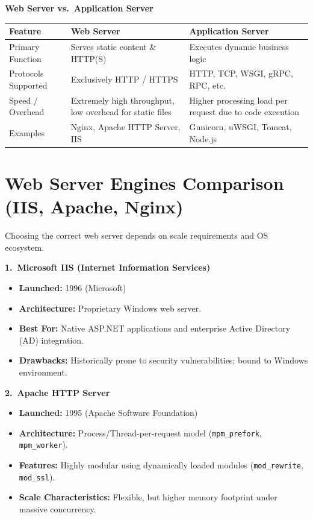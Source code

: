 ﻿\documentclass[8pt, a4paper]{article}
\begin{document}
\begin{conceptbox}
\textbf{Web Server vs.\ Application Server}

\smallskip
\begin{tabularx}{\linewidth}{l X X}
  \toprule
  \textbf{Feature} & \textbf{Web Server} & \textbf{Application Server} \\
  \midrule
  Primary Function    & Serves static content \& HTTP(S)                         & Executes dynamic business logic \\
  Protocols Supported & Exclusively HTTP / HTTPS                                 & HTTP, TCP, WSGI, gRPC, RPC, etc. \\
  Speed / Overhead    & Extremely high throughput, low overhead for static files & Higher processing load per request due to code execution \\
  Examples            & Nginx, Apache HTTP Server, IIS                           & Gunicorn, uWSGI, Tomcat, Node.js \\
  \bottomrule
\end{tabularx}
\end{conceptbox}

\section{Web Server Engines Comparison (IIS, Apache, Nginx)}

Choosing the correct web server depends on scale requirements and OS ecosystem.

\begin{conceptbox}
\textbf{1.\ Microsoft IIS (Internet Information Services)}
\begin{itemize}
  \item \textbf{Launched:} 1996 (Microsoft)
  \item \textbf{Architecture:} Proprietary Windows web server.
  \item \textbf{Best For:} Native ASP.NET applications and enterprise Active Directory (AD) integration.
  \item \textbf{Drawbacks:} Historically prone to security vulnerabilities; bound to Windows environment.
\end{itemize}
\end{conceptbox}

\begin{conceptbox}
\textbf{2.\ Apache HTTP Server}
\begin{itemize}
  \item \textbf{Launched:} 1995 (Apache Software Foundation)
  \item \textbf{Architecture:} Process/Thread-per-request model (\texttt{mpm\_prefork}, \texttt{mpm\_worker}).
  \item \textbf{Features:} Highly modular using dynamically loaded modules (\texttt{mod\_rewrite}, \texttt{mod\_ssl}).
  \item \textbf{Scale Characteristics:} Flexible, but higher memory footprint under massive concurrency.
\end{itemize}
\end{conceptbox}
\end{document}
